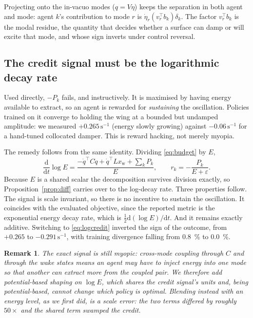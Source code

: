 \documentclass[11pt,a4paper]{article}
\newtheorem{remark}{Remark}
\begin{document}
Projecting onto the in-vacuo modes ($q = V\eta$) keeps the separation in both
agent and mode: agent $k$'s contribution to mode $r$ is $\dot\eta_r (v_r^{\top}
b_k)\delta_k$. The factor $v_r^{\top} b_k$ is the modal residue, the quantity that
decides whether a surface can damp or will excite that mode, and whose sign
inverts under control reversal.

\subsection{The credit signal must be the logarithmic decay rate}
\label{sec:log}

Used directly, $-P_k$ fails, and instructively. It is maximised by having energy
available to extract, so an agent is rewarded for \emph{sustaining} the
oscillation. Policies trained on it converge to holding the wing at a bounded but
undamped amplitude: we measured $+0.265\,\mathrm{s}^{-1}$ (energy slowly growing)
against $-0.06\,\mathrm{s}^{-1}$ for a hand-tuned collocated damper. This is
reward hacking, not merely myopia.

The remedy follows from the same identity. Dividing \eqref{eq:budget} by $E$,
\begin{equation}
\frac{\mathrm{d}}{\mathrm{d}t}\log E
= \frac{-\dot q^{\top} C \dot q + \dot q^{\top} L x_{\mathrm{w}} + \sum_k P_k}{E},
\qquad
r_k = -\frac{P_k}{E + \varepsilon}.
\label{eq:logcredit}
\end{equation}
Because $E$ is a shared scalar the decomposition survives division exactly, so
Proposition~\ref{prop:diff} carries over to the log-decay rate. Three properties
follow. The signal is scale invariant, so there is no incentive to sustain the
oscillation. It coincides with the evaluated objective, since the reported metric
is the exponential energy decay rate, which is $\tfrac12 \mathrm{d}(\log
E)/\mathrm{d}t$. And it remains exactly additive. Switching to \eqref{eq:logcredit}
inverted the sign of the outcome, from $+0.265$ to $-0.291\,\mathrm{s}^{-1}$, with
training divergence falling from \SI{0.8}{\percent} to \SI{0.0}{\percent}.

\begin{remark}
The exact signal is still myopic: cross-mode coupling through $C$ and through the
wake states means an agent may have to inject energy into one mode so that another
can extract more from the coupled pair. We therefore add potential-based shaping
\cite{ng1999shaping} on $\log E$, which shares the credit signal's units and,
being potential-based, cannot change which policy is optimal. Blending instead
with an energy \emph{level}, as we first did, is a scale error: the two terms
differed by roughly $50\times$ and the shared term swamped the credit.
\end{remark}
\end{document}
